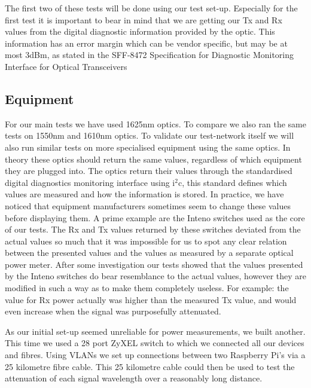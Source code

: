 \documentclass{article}
\begin{document}
The first two of these tests will be done using our test set-up.
Especially for the first test it is important to bear in mind that we are getting our Tx and Rx values from the digital diagnostic information provided by the optic.
This information has an error margin which can be vendor specific, but may be at most 3dBm, as stated in the SFF-8472 Specification for
Diagnostic Monitoring Interface for Optical Transceivers\cite{SFF:DDM}

\subsection{Equipment}
For our main tests we have used 1625nm optics.
To compare we also ran the same tests on 1550nm and 1610nm optics.
To validate our test-network itself we will also run similar tests on more specialised equipment using the same optics.
In theory these optics should return the same values, regardless of which equipment they are plugged into.
The optics return their values through the standardised digital diagnostics monitoring interface using i$^2$c, this standard defines which values are measured and how the information is stored.\cite{SFF:DDM}
In practice, we have noticed that equipment manufacturers sometimes seem to change these values before displaying them.
A prime example are the Inteno switches used as the core of our tests.
The Rx and Tx values returned by these switches deviated from the actual values so much that it was impossible for us to spot any clear relation between the presented values and the values as measured by a separate optical power meter.
After some investigation our tests showed that the values presented by the Inteno switches do bear resemblance to the actual values, however they are modified in such a way as to make them completely useless.
For example: the value for Rx power actually was higher than the measured Tx value, and would even increase when the signal was purposefully attenuated.

As our initial set-up seemed unreliable for power measurements, we built another.  This time we used a 28 port ZyXEL switch to which we connected all our devices and fibres.
Using VLANs we set up connections between two Raspberry Pi's via a 25 kilometre fibre cable.
This 25 kilometre cable could then be used to test the attenuation of each signal wavelength over a reasonably long distance.

\end{document}
